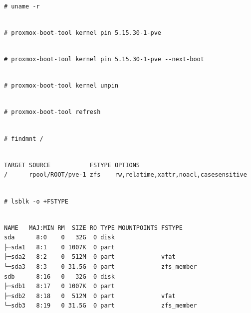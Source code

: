 \begin{lstlisting}

# uname -r

\end{lstlisting}

\begin{lstlisting}

# proxmox-boot-tool kernel pin 5.15.30-1-pve

\end{lstlisting}

\begin{lstlisting}

# proxmox-boot-tool kernel pin 5.15.30-1-pve --next-boot

\end{lstlisting}

\begin{lstlisting}

# proxmox-boot-tool kernel unpin

\end{lstlisting}

\begin{lstlisting}

# proxmox-boot-tool refresh

\end{lstlisting}

\begin{lstlisting}

# findmnt /

\end{lstlisting}

\begin{lstlisting}

TARGET SOURCE           FSTYPE OPTIONS
/      rpool/ROOT/pve-1 zfs    rw,relatime,xattr,noacl,casesensitive

\end{lstlisting}

\begin{lstlisting}

# lsblk -o +FSTYPE

\end{lstlisting}

\begin{lstlisting}

NAME   MAJ:MIN RM  SIZE RO TYPE MOUNTPOINTS FSTYPE
sda      8:0    0   32G  0 disk
├─sda1   8:1    0 1007K  0 part
├─sda2   8:2    0  512M  0 part             vfat
└─sda3   8:3    0 31.5G  0 part             zfs_member
sdb      8:16   0   32G  0 disk
├─sdb1   8:17   0 1007K  0 part
├─sdb2   8:18   0  512M  0 part             vfat
└─sdb3   8:19   0 31.5G  0 part             zfs_member

\end{lstlisting}

